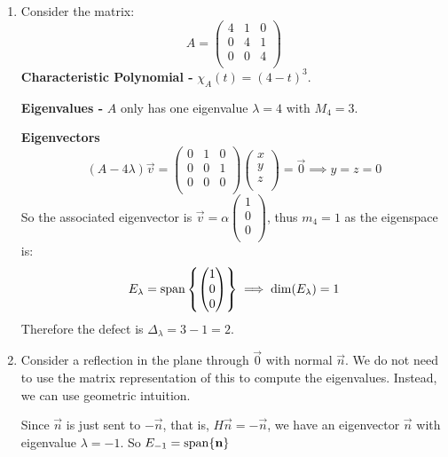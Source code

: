 \documentclass[../main.tex]{subfiles}
\begin{document}
\begin{example}
  \begin{enumerate}
    \item Consider the matrix:\[
      A = \begin{pmatrix}
      4 & 1 & 0 \\
      0 & 4 & 1 \\
      0 & 0 & 4 \\
      \end{pmatrix}
    \]
    \textbf{Characteristic Polynomial -} $\chi_A(t) = (4 - t)^3$.\par
    \textbf{Eigenvalues -} $A$ only has one eigenvalue $\lambda = 4$ with $M_4 = 3$.\par
    \textbf{Eigenvectors}
    \[
      (A - 4\lambda)\vec{v} = \begin{pmatrix}
      0 & 1 & 0 \\
      0 & 0 & 1 \\
      0 & 0 & 0 \\
      \end{pmatrix}
      \begin{pmatrix}
      x \\
      y \\
      z \\
      \end{pmatrix} = \vec{0} \implies
      y = z = 0
    \]
    So the associated eigenvector is $\vec{v} = \alpha \begin{pmatrix}
    1 \\
    0 \\
    0 \\
    \end{pmatrix}$, thus $m_4 = 1$ as the eigenspace is:
    \[
      E_\lambda = \operatorname{span}\left\{\begin{pmatrix}
      1 \\
      0 \\
      0 \\
      \end{pmatrix}\right\} \implies \dim (E_\lambda) = 1
    \]
    Therefore the defect is $\Delta_{\lambda} = 3 - 1 = 2$.
  \item Consider a reflection in the plane through $\vec{0}$ with normal $\vec{n}$.
    We do not need to use the matrix representation of this to compute the eigenvalues.
    Instead, we can use geometric intuition.

    Since $\vec{n}$ is just sent to $-\vec{n}$, that is, $H\vec{n} = -\vec{n}$, we have an eigenvector $\vec{n}$ with eigenvalue $\lambda = -1$.
    So $E_{-1} = \operatorname{span}\{\mathbf{\bm{n}}\}$


\end{enumerate}
\end{example}
\end{document}
